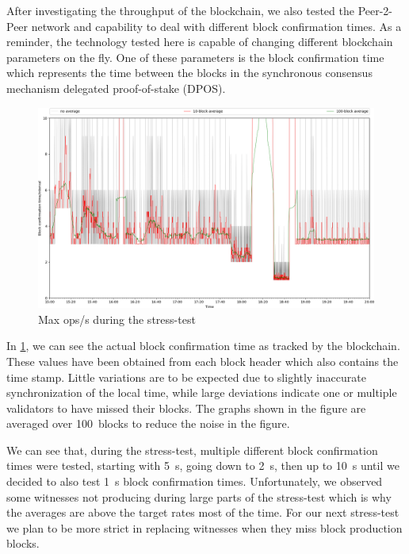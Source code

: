 After investigating the throughput of the blockchain, we also tested the
Peer-2-Peer network and capability to deal with different block confirmation
times. As a reminder, the technology tested here is capable of changing
different blockchain parameters on the fly. One of these parameters is the block
confirmation time which represents the time between the blocks in the
synchronous consensus mechanism delegated proof-of-stake (DPOS).

\begin{figure}[!htp]
 \centering
 \includegraphics[width=\linewidth]{figures/stress-test-block-time-full.png}
 \caption{Max ops/s during the stress-test}
 \label{fig:time-full}
\end{figure}

In \cref{fig:time-full}, we can see the actual block confirmation time as
tracked by the blockchain. These values have been obtained from each block
header which also contains the time stamp. Little variations are to be expected
due to slightly inaccurate synchronization of the local time, while large
deviations indicate one or multiple validators to have missed their blocks. The
graphs shown in the figure are averaged over \SI{100}{blocks} to reduce the
noise in the figure.

We can see that, during the stress-test, multiple different block confirmation
times were tested, starting with \SI{5}{s}, going down to \SI{2}{s}, then
up to \SI{10}{s} until we decided to also test \SI{1}{s} block confirmation
times. Unfortunately, we observed some witnesses not producing during large
parts of the stress-test which is why the averages are above the target rates
most of the time. For our next stress-test we plan to be more strict in
replacing witnesses when they miss block production blocks.

